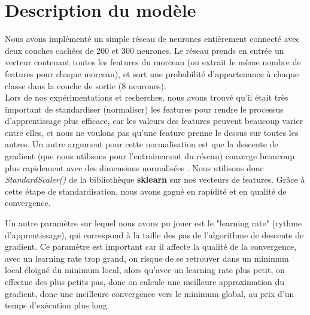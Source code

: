 \documentclass{article}
\begin{document}

\section*{Description du modèle}

Nous avons implémenté un simple réseau de neurones entièrement connecté avec deux couches cachées de 200 et 300 neurones. Le réseau prends en entrée un vecteur contenant toutes les features du morceau (on extrait le même nombre de features pour chaque morceau), et sort une probabilité d'appartenance à chaque classe dans la couche de sortie (8 neurones).\\

Lors de nos expérimentations et recherches, nous avons trouvé qu'il était très important de standardiser (normaliser) les features pour rendre le processus d'apprentissage plus efficace, car les valeurs des features peuvent beaucoup varier entre elles, et nous ne voulons pas qu'une feature prenne le dessus sur toutes les autres. Un autre argument pour cette normalisation est que la descente de gradient (que nous utilisons pour l'entrainement du réseau) converge beaucoup plus rapidement avec des dimensions normalisées \cite{DBLP:journals/corr/IoffeS15}. Nous utilisons donc \textit{StandardScaler()} de la bibliothèque \textbf{sklearn} sur nos vecteurs de features. Grâce à cette étape de standardisation, nous avons gagné en rapidité et en qualité de convergence.


Un autre paramètre sur lequel nous avons pu jouer est le "learning rate" (rythme d'apprentissage), qui correspond à la taille des pas de l'algorithme de descente de gradient. Ce paramètre est important car il affecte la qualité de la convergence, avec un learning rate trop grand, on risque de se retrouver dans un minimum local éloigné du minimum local, alors qu'avec un learning rate plus petit, on effectue des plus petits pas, donc on calcule une meilleure approximation du gradient, donc une meilleure convergence vers le minimum global, au prix d'un temps d'exécution plus long.



\end{document}
